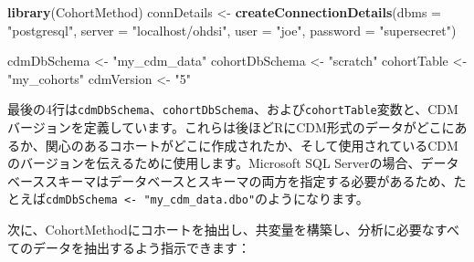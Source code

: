 \documentclass[
  11pt]{book}
\newenvironment{Shaded}{\begin{snugshade}}{\end{snugshade}}
\newcommand{\AttributeTok}[1]{\textcolor[rgb]{0.13,0.29,0.53}{#1}}
\newcommand{\FunctionTok}[1]{\textcolor[rgb]{0.13,0.29,0.53}{\textbf{#1}}}
\newcommand{\NormalTok}[1]{#1}
\newcommand{\OtherTok}[1]{\textcolor[rgb]{0.56,0.35,0.01}{#1}}
\newcommand{\StringTok}[1]{\textcolor[rgb]{0.31,0.60,0.02}{#1}}
\theoremstyle{definition}
\theoremstyle{definition}
\theoremstyle{definition}
\theoremstyle{definition}
\theoremstyle{remark}
\begin{document}
\begin{Shaded}
\begin{Highlighting}[]
\FunctionTok{library}\NormalTok{(CohortMethod)}
\NormalTok{connDetails }\OtherTok{\textless{}{-}} \FunctionTok{createConnectionDetails}\NormalTok{(}\AttributeTok{dbms =} \StringTok{"postgresql"}\NormalTok{,}
                                       \AttributeTok{server =} \StringTok{"localhost/ohdsi"}\NormalTok{,}
                                       \AttributeTok{user =} \StringTok{"joe"}\NormalTok{,}
                                       \AttributeTok{password =} \StringTok{"supersecret"}\NormalTok{)}

\NormalTok{cdmDbSchema }\OtherTok{\textless{}{-}} \StringTok{"my\_cdm\_data"}
\NormalTok{cohortDbSchema }\OtherTok{\textless{}{-}} \StringTok{"scratch"}
\NormalTok{cohortTable }\OtherTok{\textless{}{-}} \StringTok{"my\_cohorts"}
\NormalTok{cdmVersion }\OtherTok{\textless{}{-}} \StringTok{"5"}
\end{Highlighting}
\end{Shaded}

最後の4行は\texttt{cdmDbSchema}、\texttt{cohortDbSchema}、および\texttt{cohortTable}変数と、CDMバージョンを定義しています。これらは後ほどRにCDM形式のデータがどこにあるか、関心のあるコホートがどこに作成されたか、そして使用されているCDMのバージョンを伝えるために使用します。Microsoft SQL Serverの場合、データベーススキーマはデータベースとスキーマの両方を指定する必要があるため、たとえば\texttt{cdmDbSchema\ \textless{}-\ "my\_cdm\_data.dbo"}のようになります。

次に、CohortMethodにコホートを抽出し、共変量を構築し、分析に必要なすべてのデータを抽出するよう指示できます：
\end{document}
